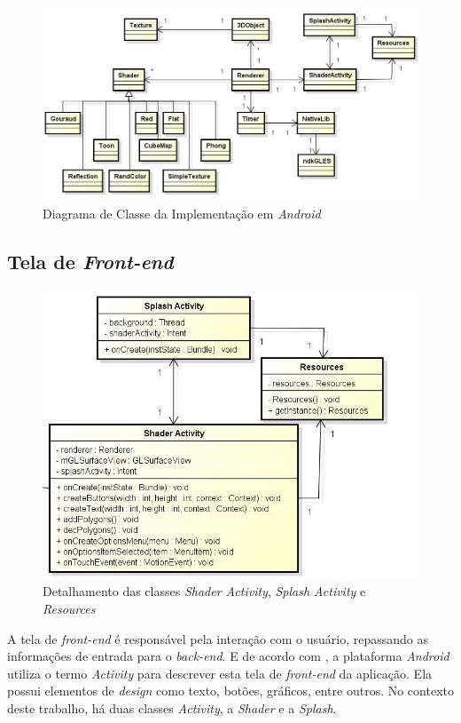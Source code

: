 	\begin{figure}[ht]
	\centering
		\includegraphics[keepaspectratio=true,scale=0.6]{figuras/class_diagram.jpg}
	\caption{Diagrama de Classe da Implementação em \textit{Android}}
	\label{class_diagram}
	\end{figure}

\subsection{Tela de \textit{Front-end}}

	\begin{figure}[ht]
	\centering
		\includegraphics[keepaspectratio=true,scale=0.6]{figuras/shader_splash.jpg}
	\caption{Detalhamento das classes \textit{Shader Activity}, \textit{Splash Activity} e \textit{Resources}}
	\label{shader_splash}
	\end{figure}

	A tela de \textit{front-end} é responsável pela interação com o usuário, repassando as informações de entrada para o \textit{back-end}. E de acordo com \cite{androidsdkmanager}, a plataforma \textit{Android} utiliza o termo \textit{Activity} para descrever esta tela de \textit{front-end} da aplicação. Ela possui elementos de \textit{design} como texto, botões, gráficos, entre outros. No contexto deste trabalho, há duas classes \textit{Activity}, a \textit{Shader} e a \textit{Splash}. 

